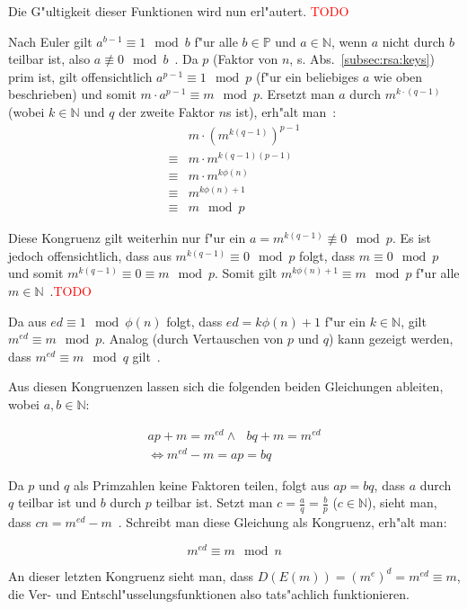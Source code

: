 \documentclass[12pt]{article}
\newcommand{\todo}[1]{\textcolor{red}{\mbox{TODO}}\marginpar{\textcolor{red}{#1}}}
\begin{document}
Die G"ultigkeit dieser Funktionen wird nun erl"autert. \todo{So oder and\-ers\-her\-um?}

Nach Euler gilt $a^{b-1} \equiv 1 \mod b$ f"ur alle $b \in \mathbb{P}$ und $a \in \mathbb{N}$,
wenn $a$ nicht durch $b$ teilbar ist, also $a \not\equiv 0 \mod b$~\cite{euler41}.
Da $p$ (Faktor von $n$, s. Abs.~\ref{subsec:rsa:keys}) prim ist,
gilt offensichtlich $a^{p-1} \equiv 1 \mod p$
(f"ur ein beliebiges $a$ wie oben beschrieben) und somit $m \cdot a^{p-1} \equiv m \mod p$.
Ersetzt man $a$ durch $m^{k \cdot (q-1)}$
(wobei $k \in \mathbb{N}$ und $q$ der zweite Faktor $n$s ist), erh"alt man~\cite{rsa}:
\[
\begin{aligned}
& m \cdot \left(m^{k(q-1)}\right)^{p-1} \\
\equiv & m \cdot m^{k(q-1)(p-1)} \\
\equiv & m \cdot m^{k\phi(n)} \\
\equiv & m^{k\phi(n) + 1} \\
\equiv & m \mod p
\end{aligned}
\]

Diese Kongruenz gilt weiterhin nur f"ur ein $a = m^{k(q-1)} \not\equiv 0 \mod p$.
Es ist jedoch offensichtlich, dass aus $m^{k(q-1)} \equiv 0 \mod p$ folgt,
dass $m \equiv 0 \mod p$ und somit $m^{k(q-1)} \equiv 0 \equiv m \mod p$.
Somit gilt $m^{k\phi(n)+1} \equiv m \mod p$ f"ur alle $m \in \mathbb{N}$~\cite{rsa}.\todo{So OK?}

Da aus $ed \equiv 1 \mod \phi(n)$ folgt, dass $ed = k\phi(n) +1$ f"ur ein $k \in \mathbb{N}$, gilt $m^{ed} \equiv m \mod p$.
Analog (durch Vertauschen von $p$ und $q$) kann gezeigt werden,
dass $m^{ed} \equiv m \mod q$ gilt~\cite{rsa}.

Aus diesen Kongruenzen lassen sich die folgenden beiden Gleichungen ableiten,
wobei $a, b \in \mathbb{N}$:

\[
\begin{aligned}
ap + m = m^{ed} \land ~~~ bq + m = m^{ed} \\
\iff m^{ed} - m = ap = bq
\end{aligned}
\]

Da $p$ und $q$ als Primzahlen keine Faktoren teilen, folgt aus $ap = bq$,
dass $a$ durch $q$ teilbar ist und $b$ durch $p$ teilbar ist.
Setzt man $c = \frac{a}{q} = \frac{b}{p}$ ($c \in \mathbb{N}$),
sieht man, dass $cn = m^{ed} - m$~\cite{pii1}.
Schreibt man diese Gleichung als Kongruenz, erh"alt man:

\[
m^{ed} \equiv m \mod n
\]

An dieser letzten Kongruenz sieht man, dass $D(E(m)) = (m^e)^d = m^{ed} \equiv m$,
die Ver- und Entschl"usselungsfunktionen also tats"achlich funktionieren.
\end{document}
